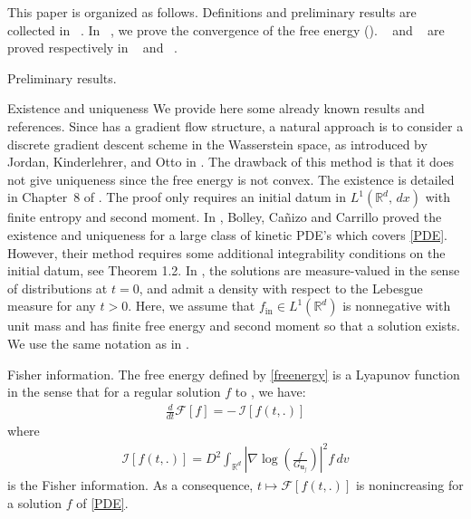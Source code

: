 \documentclass[reqno]{amsart} %
\begin{document}
\indent
This paper is organized as follows. Definitions and preliminary results are collected in~ . In ~, we prove the convergence of the free energy (). ~ and ~ are proved respectively in  ~ and ~.





    
\begin{section}{Preliminary results.}
\label{sec:preliminary}


\begin{subsection}{Existence and uniqueness}
    We provide here some already known results and references. Since  has a gradient flow structure, a natural approach is to consider a discrete gradient descent scheme in the Wasserstein space, as introduced by Jordan, Kinderlehrer, and Otto in \cite{JordanOttoKinder}. The drawback of this method is that it does not give uniqueness since the free energy is not convex. The existence is detailed in  Chapter~8 of \cite{Villaniopttranspbook}. The proof only requires an initial datum in $L^1(\mathbb{R}^d, \,dx)$ with finite entropy and second moment. In \cite{bolley2010stochastic}, Bolley, Cañizo and Carrillo proved the existence and uniqueness for a large class of kinetic PDE's which covers \eqref{PDE}. However, their method requires some additional  integrability conditions on the initial datum, see \cite{bolley2010stochastic} Theorem 1.2. In \cite{bolley2010stochastic,Villaniopttranspbook}, the solutions are measure-valued in the sense of distributions at $t=0$, and admit a density with respect to the Lebesgue measure for any $t>0$. Here, we assume that $f_{\mathrm{in}} \in L^1(\mathbb{R}^d)$ is nonnegative with unit mass and has finite free energy and second moment so that a solution exists. We use the same notation as in \cite{Li2021}.
\end{subsection}

\begin{subsection}{Fisher information.}
    The free energy defined by \eqref{freenergy} is a Lyapunov function in the sense that for a regular solution $f$ to , we have:
\begin{align}
\label{fisher}
    \frac{d}{dt} \mathcal{F}[f]=-\,\mathcal{I}[f(t,.)]
\end{align}
where 
\begin{align*}
    \mathcal{I}[f(t,.)]=D^2 \int_{\mathbb{R}^d} \left|\nabla \log\left(\frac{f}{G_{\mathbf{u}_{f}}}\right)\right|^2f \, dv
\end{align*}
is the Fisher information. As a consequence, $t\mapsto \mathcal{F}[f(t,.)]$ is nonincreasing for a solution $f$ of \eqref{PDE}. 
\end{subsection}


\end{section}
\end{document}
